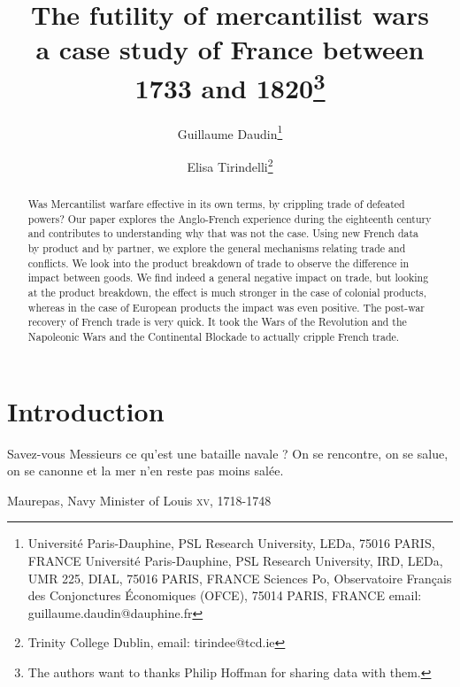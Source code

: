 \documentclass[12pt,a4paper,notitlepage,english]{article}
\author{
  Guillaume Daudin\thanks{Université Paris-Dauphine, PSL Research University, LEDa, 75016 PARIS, FRANCE Université Paris-Dauphine, PSL Research University, IRD, LEDa, UMR 225, DIAL, 75016 PARIS, FRANCE Sciences Po, Observatoire Français des Conjonctures Économiques (OFCE), 75014 PARIS, FRANCE email: guillaume.daudin@dauphine.fr}
  \and
  Elisa Tirindelli\thanks{Trinity College Dublin, email: tirindee@tcd.ie}
}
\title{The futility of mercantilist wars \\ a case study of France between 1733 and 1820\thanks{The authors want to thanks Philip Hoffman for sharing data with them.}}
\date{}
\begin{document}
\maketitle






\begin{abstract}
Was Mercantilist warfare effective in its own terms, by crippling trade of defeated powers? Our paper explores the Anglo-French experience during the eighteenth century and contributes to understanding why that was not the case. Using new French data by product and by partner, we explore the general mechanisms relating trade and conflicts. We look into the product breakdown of trade to observe the difference in impact between goods. We find indeed a general negative impact on trade, but looking at the product breakdown, the effect is much stronger in the case of colonial products, whereas in the case of European products the impact was even positive. The post-war recovery of French trade is very quick. It took the Wars of the Revolution and the Napoleonic Wars and the Continental Blockade to actually cripple French trade.
\end{abstract}


\section{Introduction}

\epigraph{Savez-vous Messieurs ce qu’est une bataille navale ? On se rencontre, on se salue, on se canonne et la mer n’en reste pas moins salée.}{Maurepas, Navy Minister of Louis  \textsc{xv}, 1718-1748}



\maketitle
\end{document}
